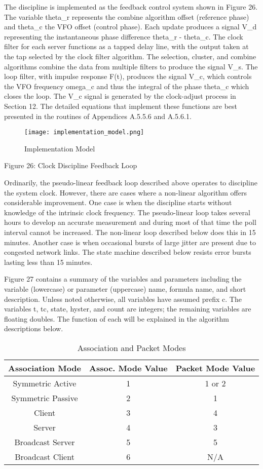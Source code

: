 The discipline is implemented as the feedback control system shown in
Figure 26.  The variable theta\_r represents the combine algorithm
offset (reference phase) and theta\_c the VFO offset (control phase).
Each update produces a signal V\_d representing the instantaneous
phase difference theta\_r - theta\_c.  The clock filter for each server
functions as a tapped delay line, with the output taken at the tap
selected by the clock filter algorithm.  The selection, cluster, and
combine algorithms combine the data from multiple filters to produce
the signal V\_s.  The loop filter, with impulse response F(t),
produces the signal V\_c, which controls the VFO frequency omega\_c and
thus the integral of the phase theta\_c which closes the loop.  The
V\_c signal is generated by the clock-adjust process in Section 12.
The detailed equations that implement these functions are best
presented in the routines of Appendices A.5.5.6 and A.5.6.1.

\begin{figure}
\centering
\texttt{[image: implementation\_model.png]}
\caption{Implementation Model}
\label{implementation_model}
\end{figure}
              Figure 26: Clock Discipline Feedback Loop

Ordinarily, the pseudo-linear feedback loop described above operates
to discipline the system clock.  However, there are cases where a
non-linear algorithm offers considerable improvement.  One case is
when the discipline starts without knowledge of the intrinsic clock
frequency.  The pseudo-linear loop takes several hours to develop an
accurate measurement and during most of that time the poll interval
cannot be increased.  The non-linear loop described below does this
in 15 minutes.  Another case is when occasional bursts of large
jitter are present due to congested network links.  The state machine
described below resists error bursts lasting less than 15 minutes.

Figure 27 contains a summary of the variables and parameters
including the variable (lowercase) or parameter (uppercase) name,
formula name, and short description.  Unless noted otherwise, all
variables have assumed prefix c.  The variables t, tc, state, hyster,
and count are integers; the remaining variables are floating doubles.
The function of each will be explained in the algorithm descriptions
below.

\begin{table}[htb]
\center
\begin{tabular}{c | c | c}
Association Mode & Assoc. Mode Value & Packet Mode Value \\
\hline
\hline
Symmetric Active & 1 & 1 or 2 \\
Symmetric Passive & 2 & 1 \\
Client & 3 & 4 \\
Server & 4 & 3 \\
Broadcast Server & 5 & 5 \\
Broadcast Client & 6 & N/A \\
\hline
\end{tabular}
\label{association_and_packet_modes}
\caption{Association and Packet Modes}
\end{table}

